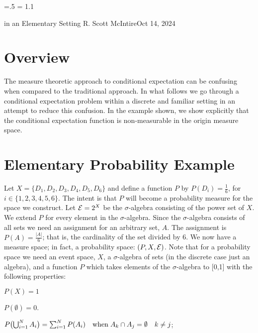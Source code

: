 




\parindent=0pt
\parskip=.5\baselineskip
\baselineskip = 1.1\baselineskip

\footline{\hss\tenrm\folio\hss}

        {in an Elementary Setting}
{R. Scott McIntire}{Oct 14, 2024}

\section{Overview}
The measure theoretic approach to conditional expectation can be confusing
when compared to the traditional approach.
In what follows we go through a conditional 
expectation problem within a discrete and familiar setting in an attempt 
to reduce this confusion. In the example shown, we show explicitly that the 
conditional expectation function is non-measurable in the origin 
measure space.


\section{Elementary Probability Example}
Let $X = \{D_1, D_2, D_3, D_4, D_5, D_6\}$ and define a function $P$ by 
$P(D_i) = \frac{1}{6}$, for $i\in \{1,2,3,4,5,6\}$. The intent is that $P$ will 
become a probability measure for the space we construct.
Let ${\cal E} = 2^X$ be the $\sigma$-algebra 
consisting of the power set of $X$. We extend $P$ for every element in the $\sigma$-algebra.
Since the $\sigma$-algebra consists of all sets 
we need an assignment for an arbitrary set, $A$. 
The assignment is $P(A) = \frac{|A|}{6}$; that is, the cardinality of the set divided by 6.
We now have a measure space; in fact, a probability space: $(P,X,{\cal E})$.
Note that for a probability space we need an event space, $X$, a $\sigma$-algebra of sets 
(in the discrete case just an algebra), and a function $P$ which takes 
elements of the $\sigma$-algebra to [0,1] with the following properties:

\beginEnum
\item{$P(X) = 1$}
\item{$P(\emptyset) = 0$.}
\item{$
P\bigl(\mathop{\bigcup}_{i=1}^N A_i\bigr) = \sum_{i=1}^N P(A_i) 
\quad {\rm when}\;  A_k \cap A_j = \emptyset \quad k\neq j
$;}
\endEnum

